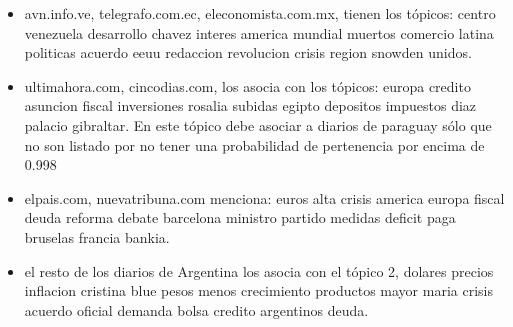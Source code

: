 \documentclass[8.5pt,twoside,twocolumn]{article}
\begin{document}
\begin{itemize}
\item avn.info.ve, telegrafo.com.ec, eleconomista.com.mx, tienen los t\'opicos: centro venezuela
 desarrollo chavez interes america mundial muertos comercio latina
 politicas acuerdo eeuu redaccion revolucion crisis region snowden unidos. 	

\item ultimahora.com, cincodias.com, los asocia con los t\'opicos: europa credito asuncion
 fiscal inversiones rosalia subidas egipto depositos impuestos diaz palacio gibraltar. 
En este t\'opico debe asociar a diarios de paraguay s\'olo que no son listado por no 
tener una probabilidad de pertenencia por encima de 0.998
 
\item elpais.com, nuevatribuna.com menciona: euros alta crisis america europa fiscal 
deuda reforma  debate barcelona ministro partido 
medidas deficit paga bruselas francia bankia.

\item el resto de los diarios de Argentina los asocia con el t\'opico 2, dolares precios 
inflacion cristina blue pesos menos crecimiento productos mayor maria 
crisis acuerdo oficial demanda bolsa credito argentinos deuda.

\end{itemize}
\end{document}
